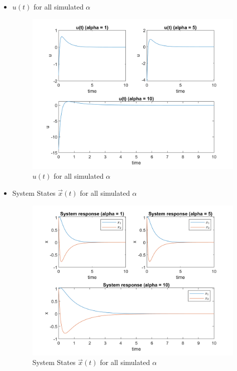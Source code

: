 \begin{itemize}
\begin{figure}[H]
\end{figure}
\item $u(t)$ for all simulated $\alpha$
\begin{figure}[H]
	\caption{$u(t)$ for all simulated $\alpha$}
	\centering
	\includegraphics[width=12cm]{../Code/Q3/figures/SubplotQ3_du.png}
\end{figure}
\item System States $\vec x(t)$ for all simulated $\alpha$
\begin{figure}[H]
	\caption{System States $\vec x(t)$ for all simulated $\alpha$}
	\centering
	\includegraphics[width=12cm]{../Code/Q3/figures/SubplotQ3_d.png}
\end{figure}
\end{itemize}